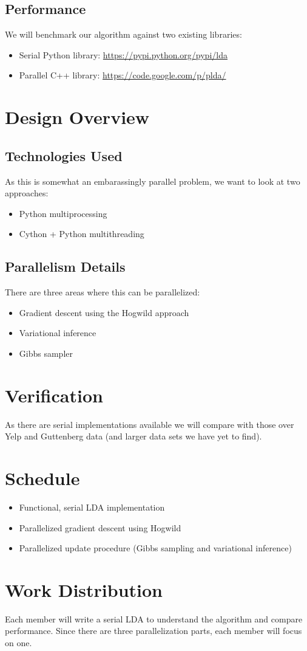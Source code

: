 \documentclass{article}
\begin{document}
	\subsection{Performance}
		We will benchmark our algorithm against two existing libraries:
		\begin{itemize}
			\item Serial Python library: \url{https://pypi.python.org/pypi/lda}
			\item Parallel C++ library: \url{https://code.google.com/p/plda/}
		\end{itemize}
\section{Design Overview}
	\subsection{Technologies Used}
		As this is somewhat an embarassingly parallel problem, we want to look at two approaches:
		\begin{itemize}
			\item Python multiprocessing
			\item Cython + Python multithreading
		\end{itemize}

 	\subsection{Parallelism Details}
 		There are three areas where this can be parallelized:
 		\begin{itemize}
 			\item Gradient descent using the Hogwild approach
 			\item Variational inference
 			\item Gibbs sampler
 		\end{itemize}
 \section{Verification}
 	As there are serial implementations available we will compare with those over Yelp and Guttenberg data (and larger data sets we have yet to find).
 \section{Schedule}
 	\begin{itemize}
 		\item Functional, serial LDA implementation
 		\item Parallelized gradient descent using Hogwild
 		\item Parallelized update procedure (Gibbs sampling and variational inference)
 	\end{itemize}
 \section{Work Distribution}
 	Each member will write a serial LDA to understand the algorithm and compare performance. Since there are three parallelization parts, each member will focus on one.
\end{document}
